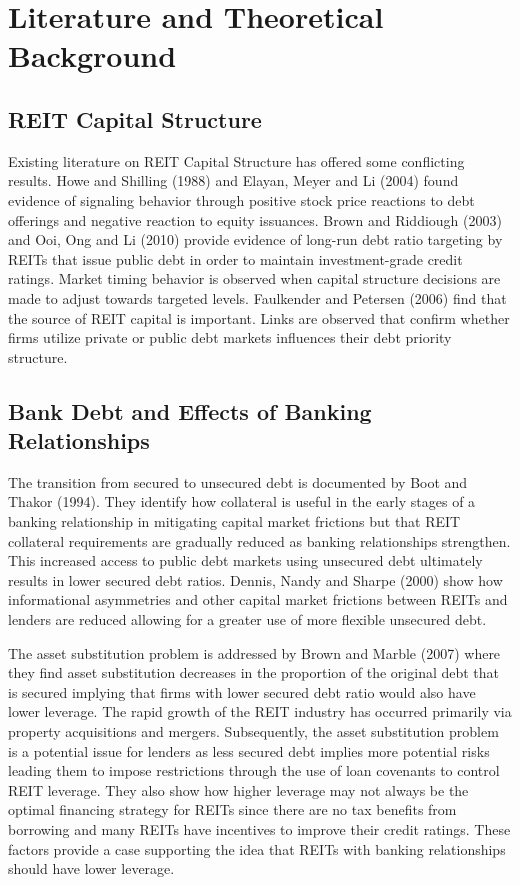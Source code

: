 \documentclass[a4paper, 12pt]{article} %
\begin{document}
\section*{Literature and Theoretical Background}

\subsection*{REIT Capital Structure } 
Existing literature on REIT Capital Structure has offered some conflicting results. Howe and Shilling (1988) and Elayan, Meyer and Li (2004) found evidence of signaling behavior through positive stock price reactions to debt offerings and negative reaction to equity issuances. Brown and Riddiough (2003) and Ooi, Ong and Li (2010) provide evidence of long-run debt ratio targeting by REITs that issue public debt in order to maintain investment-grade credit ratings. Market timing behavior is observed when capital structure decisions are made to adjust towards targeted levels. Faulkender and Petersen (2006) find that the source of REIT capital is important. Links are observed that confirm whether firms utilize private or public debt markets influences their debt priority structure. 

\subsection*{Bank Debt and Effects of Banking Relationships}

The transition from secured to unsecured debt is documented by Boot and Thakor (1994). They identify how collateral is useful in the early stages of a banking relationship in mitigating capital market frictions but that REIT collateral requirements are gradually reduced as banking relationships strengthen. This increased access to public debt markets using unsecured debt ultimately results in lower secured debt ratios. Dennis, Nandy and Sharpe (2000) show how informational asymmetries and other capital market frictions between REITs and lenders are reduced allowing for a greater use of more flexible unsecured debt. 

The asset substitution problem is addressed by Brown and Marble (2007) where they find asset substitution decreases in the proportion of the original debt that is secured implying that firms with lower secured debt ratio would also have lower leverage. The rapid growth of the REIT industry has occurred primarily via property acquisitions and mergers. Subsequently, the asset substitution problem is a potential issue for lenders as less secured debt implies more potential risks leading them to impose restrictions through the use of loan covenants to control REIT leverage. They also show how higher leverage may not always be the optimal financing strategy for REITs since there are no tax benefits from borrowing and many REITs have incentives to improve their credit ratings. These factors provide a case supporting the idea that REITs with banking relationships should have lower leverage.
\end{document}
